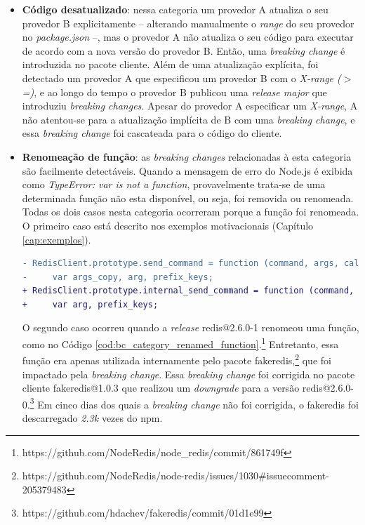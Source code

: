 \begin{itemize}
    \item \textbf{Código desatualizado}: nessa categoria um provedor \textsf{A} atualiza o seu provedor \textsf{B} explicitamente -- alterando manualmente o \textit{range} do seu provedor no \textit{package.json} --, mas o provedor \textsf{A} não atualiza o seu código para executar de acordo com a nova versão do provedor \textsf{B}. Então, uma \textit{breaking change} é introduzida no pacote cliente. Além de uma atualização explícita, foi detectado um provedor \textsf{A} que especificou um provedor \textsf{B} com o \textit{X-range ($>$=)}, e ao longo do tempo o provedor \textsf{B} publicou uma \textit{release major} que introduziu \textit{breaking changes}. Apesar do provedor \textsf{A} especificar um \textit{X-range}, \textsf{A} não atentou-se para a atualização implícita de \textsf{B} com uma \textit{breaking change}, e essa \textit{breaking change} foi cascateada para o código do cliente.

    \item \textbf{Renomeação de função}: as \textit{breaking changes} relacionadas à esta categoria são facilmente detectáveis. Quando a mensagem de erro do \textsf{Node.js} é exibida como \textit{TypeError: var is not a function}, provavelmente trata-se de uma determinada função não esta disponível, ou seja, foi removida ou renomeada. Todas os dois casos nesta categoria ocorreram porque a função foi renomeada. O primeiro caso está descrito nos exemplos motivacionais (Capítulo \ref{cap:exemplos}).

	 \begin{lstlisting}[numbers=none, language=diff, label=cod:bc_category_renamed_function, caption={Exemplo da categoria \textit{Renomeação de função}}]
- RedisClient.prototype.send_command = function (command, args, callback) {
-     var args_copy, arg, prefix_keys;
+ RedisClient.prototype.internal_send_command = function (command, args, callback) {
+     var arg, prefix_keys;
	 \end{lstlisting}

    O segundo caso ocorreu quando a \textit{release} \textsf{redis@2.6.0-1} renomeou uma função, como no Código \ref{cod:bc_category_renamed_function}.\footnote{https://github.com/NodeRedis/node\_redis/commit/861749f} Entretanto, essa função era apenas utilizada internamente pelo pacote \textsf{fakeredis},\footnote{https://github.com/NodeRedis/node-redis/issues/1030\#issuecomment-205379483} que foi impactado pela \textit{breaking change}. Essa \textit{breaking change} foi corrigida no pacote cliente \textsf{fakeredis@1.0.3} que realizou um \textit{downgrade} para a versão \textsf{redis@2.6.0-0}.\footnote{https://github.com/hdachev/fakeredis/commit/01d1e99} Em cinco dias dos quais a \textit{breaking change} não foi corrigida, o \textsf{fakeredis} foi descarregado \textit{2.3k} vezes do \textsf{npm}.


\end{itemize}
